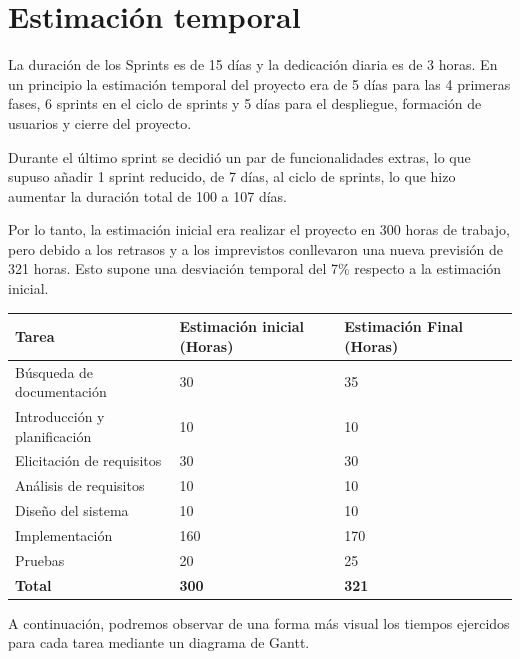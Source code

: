 \section{Estimación temporal}

La duración de los Sprints es de 15 días y la dedicación diaria es de 3 horas. En un principio la estimación temporal del proyecto era de 5 días para las 4 primeras fases, 6 sprints en el ciclo de sprints y 5 días para el despliegue, formación de usuarios y cierre del proyecto.

Durante el último sprint se decidió un par de funcionalidades extras, lo que supuso añadir 1 sprint reducido, de 7 días, al ciclo de sprints, lo que hizo aumentar la duración total de 100 a 107 días.

Por lo tanto, la estimación inicial era realizar el proyecto en 300 horas de trabajo, pero debido a los retrasos y a los imprevistos conllevaron una nueva previsión de 321 horas. Esto supone una desviación temporal del 7\% respecto a la estimación inicial.

\bigskip

\begin{center}
    \begin{tabulary}{0.8\textwidth}{|L|L|L|L|}
        \hline
            \textbf{Tarea} & \textbf{Estimación inicial (Horas)} & \textbf{Estimación Final (Horas)} \\
            \hline
            Búsqueda de documentación & 30 & 35 \\
            \hline
            Introducción y planificación & 10 & 10 \\
            \hline
            Elicitación de requisitos & 30 & 30 \\
            \hline
            Análisis de requisitos & 10 & 10 \\
            \hline
            Diseño del sistema & 10 & 10 \\
            \hline
            Implementación & 160 & 170 \\
            \hline
            Pruebas & 20 & 25 \\
            \hline
            \textbf{Total} & \textbf{300} & \textbf{321} \\
            \hline
    \end{tabulary}
\end{center}

\bigskip

A continuación, podremos observar de una forma más visual los tiempos ejercidos para cada tarea mediante un diagrama de Gantt.


